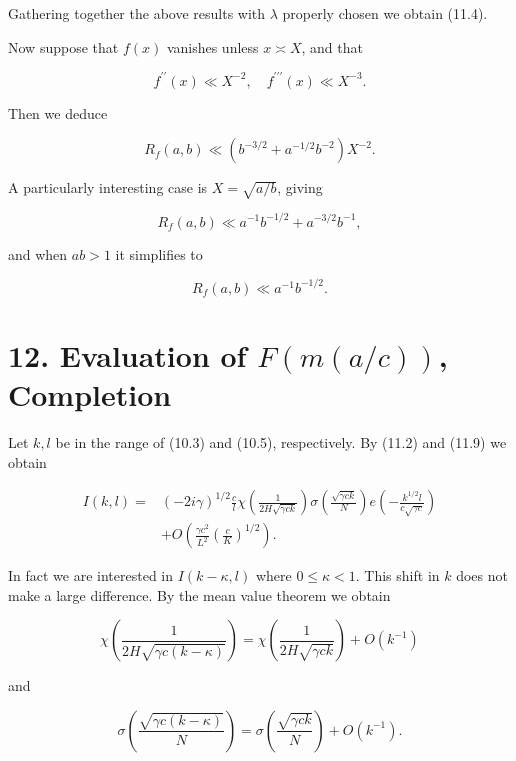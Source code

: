 \documentclass[10pt]{article}
\begin{document}
Gathering together the above results with $\lambda$ properly chosen we obtain (11.4).

Now suppose that $f(x)$ vanishes unless $x\asymp X$, and that


\begin{equation*}
f^{\prime \prime}(x) \ll X^{-2}, \quad f^{\prime \prime \prime}(x) \ll X^{-3} . \tag{11.6}
\end{equation*}


Then we deduce


\begin{equation*}
R_{f}(a, b) \ll\left(b^{-3 / 2}+a^{-1 / 2} b^{-2}\right) X^{-2} . \tag{11.7}
\end{equation*}


A particularly interesting case is $X=\sqrt{a / b}$, giving


\begin{equation*}
R_{f}(a, b) \ll a^{-1} b^{-1 / 2}+a^{-3 / 2} b^{-1}, \tag{11.8}
\end{equation*}


and when $a b>1$ it simplifies to


\begin{equation*}
R_{f}(a, b) \ll a^{-1} b^{-1 / 2} . \tag{11.9}
\end{equation*}


\section*{12. Evaluation of $F(m(a / c))$, Completion}
Let $k, l$ be in the range of (10.3) and (10.5), respectively. By (11.2) and (11.9) we obtain

$$
\begin{aligned}
I(k,l)={}&(-2i\gamma)^{1/2}\frac{c}{l}
\chi\left(\frac{1}{2H\sqrt{\gamma ck}}\right)
\sigma\left(\frac{\sqrt{\gamma ck}}{N}\right)
 e\left(-\frac{k^{1/2}l}{c\sqrt{\gamma c}}\right)\\
&+O\left(\frac{\gamma c^{2}}{L^{2}}\left(\frac{c}{K}\right)^{1/2}\right).
\end{aligned}
$$

In fact we are interested in $I(k-\kappa, l)$ where $0 \leqslant \kappa<1$. This shift in $k$ does not make a large difference. By the mean value theorem we obtain

$$
\chi\left(\frac{1}{2 H \sqrt{\gamma c(k-\kappa)}}\right)=\chi\left(\frac{1}{2 H \sqrt{\gamma c k}}\right)+O\left(k^{-1}\right)
$$

and

$$
\sigma\left(\frac{\sqrt{\gamma c(k-\kappa)}}{N}\right)=\sigma\left(\frac{\sqrt{\gamma c k}}{N}\right)+O\left(k^{-1}\right) .
$$
\end{document}
